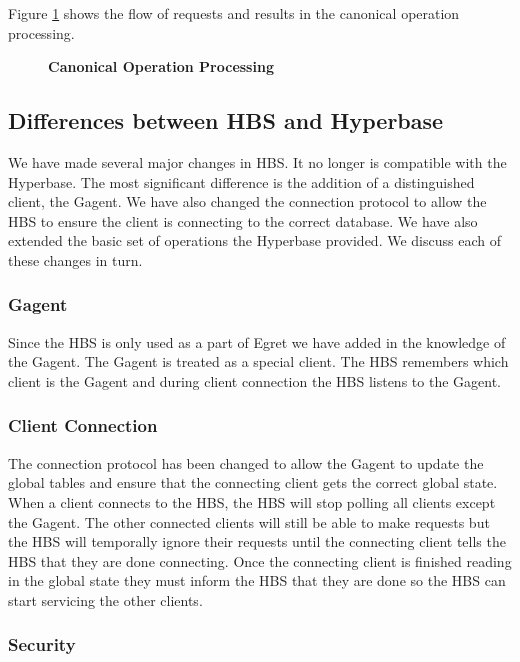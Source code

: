 Figure \ref{fig:Canonical} shows the flow of requests and results in the
canonical operation processing.

\begin{figure}[htb]
  \centerline{}
  \caption{{\bf Canonical Operation Processing}}
  \label{fig:Canonical}
\end{figure}

\subsection{Differences between HBS and Hyperbase}

We have made several major changes in HBS.  It no longer is compatible with
the Hyperbase.  The most significant difference is the addition of a
distinguished client, the Gagent.  We have also changed the connection
protocol to allow the HBS to ensure the client is connecting to the correct
database.  We have also extended the basic set of operations the Hyperbase
provided.  We discuss each of these changes in turn.

\subsubsection{Gagent}

Since the HBS is only used as a part of Egret \cite{csdl-92-01,csdl-93-09}
we have added in the knowledge of the Gagent.  The Gagent is treated as a
special client.  The HBS remembers which client is the Gagent and during
client connection the HBS listens to the Gagent.

\subsubsection{Client Connection}

The connection protocol has been changed to allow the Gagent to update the
global tables and ensure that the connecting client gets the correct global
state.  When a client connects to the HBS, the HBS will stop polling all
clients except the Gagent.  The other connected clients will still be able
to make requests but the HBS will temporally ignore their requests until
the connecting client tells the HBS that they are done connecting.  Once
the connecting client is finished reading in the global state they must
inform the HBS that they are done so the HBS can start servicing the other
clients. 


\subsubsection{Security}

